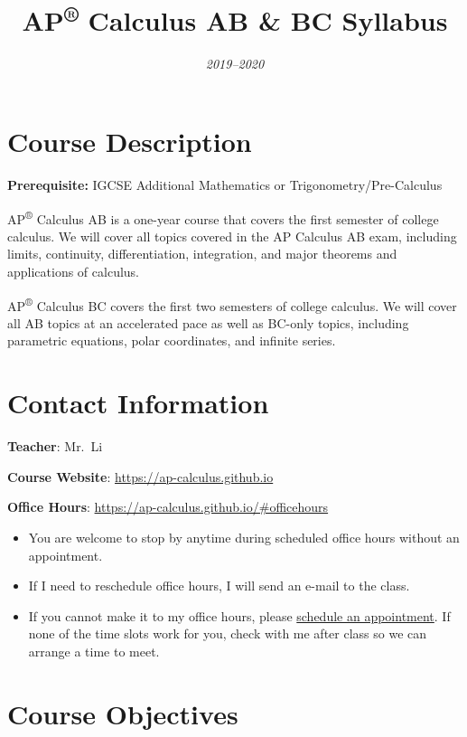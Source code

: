 \documentclass[12pt,fleqn]{article}
\title{AP\textsuperscript{®} Calculus AB \& BC Syllabus}
\author{}
\date{\emph{2019--2020}}
\providecommand{\tightlist}{%
  \setlength{\itemsep}{0pt}\setlength{\parskip}{0pt}}
\begin{document}
\maketitle

{
\setcounter{tocdepth}{2}
\tableofcontents
}
\hypertarget{course-description}{%
\section{Course Description}\label{course-description}}

\textbf{Prerequisite:} IGCSE Additional Mathematics or Trigonometry/Pre-Calculus

AP\textsuperscript{®} Calculus AB is a one-year course that covers the first semester of college calculus. We will cover all topics covered in the AP Calculus AB exam, including limits, continuity, differentiation, integration, and major theorems and applications of calculus.

AP\textsuperscript{®} Calculus BC covers the first two semesters of college calculus. We will cover all AB topics at an accelerated pace as well as BC-only topics, including parametric equations, polar coordinates, and infinite series.

\hypertarget{contact-information}{%
\section{Contact Information}\label{contact-information}}

\textbf{Teacher}: Mr.~Li

\textbf{Course Website}: \url{https://ap-calculus.github.io}

\textbf{Office Hours}: \url{https://ap-calculus.github.io/\#officehours}

\begin{itemize}
\tightlist
\item
  You are welcome to stop by anytime during scheduled office hours without an appointment.
\item
  If I need to reschedule office hours, I will send an e-mail to the class.
\item
  If you cannot make it to my office hours, please \href{https://ap-calculus.github.io/\#officehours}{schedule an appointment}. If none of the time slots work for you, check with me after class so we can arrange a time to meet.
\end{itemize}

\hypertarget{course-objectives}{%
\section{Course Objectives}\label{course-objectives}}
\end{document}
